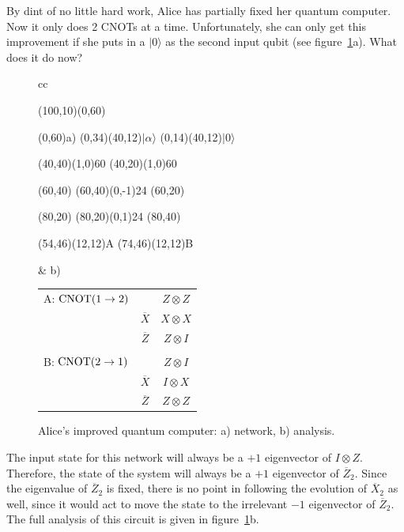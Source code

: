 \begin{example}
By dint of no little hard work, Alice has partially fixed her quantum
computer.  Now it only does 2 CNOTs at a time.  Unfortunately, she
can only get this improvement if she puts in a $|0\rangle$ as the
second input qubit (see figure~\ref{fig:XORswap}a).  What does it do now?
\end{example}
\begin{figure}
\centering
\begin{tabular}{cc}
\begin{picture}(100,10)(0,60)

\put(0,60){a)}
\put(0,34){\makebox(40,12){$|\alpha\rangle$}}
\put(0,14){\makebox(40,12){$|0\rangle$}}

\put(40,40){\line(1,0){60}}
\put(40,20){\line(1,0){60}}

\put(60,40){}
\put(60,40){\line(0,-1){24}}
\put(60,20){}

\put(80,20){}
\put(80,20){\line(0,1){24}}
\put(80,40){}

\put(54,46){\makebox(12,12){A}}
\put(74,46){\makebox(12,12){B}}

\end{picture}
& b)
\begin{tabular}[t]{lcc}
A: ${\rm CNOT}(1 \rightarrow 2)$ & & $Z \otimes Z$ \\
& $\overline{X}$ & $X \otimes X$ \\
& $\overline{Z}$ & $Z \otimes I$ \\
\\
B: ${\rm CNOT}(2 \rightarrow 1)$ & & $Z \otimes I$ \\
& $\overline{X}$ & $I \otimes X$ \\
& $\overline{Z}$ & $Z \otimes Z$
\end{tabular}
\end{tabular}
\caption{Alice's improved quantum computer: a) network, b) analysis.}
\label{fig:XORswap}
\end{figure}

The input state for this network will always be a $+1$ eigenvector of
$I \otimes Z$.  Therefore, the state of the system will always be a
$+1$ eigenvector of $\overline{Z}_2$.  Since the eigenvalue of
$\overline{Z}_2$ is fixed, there is no point in following the
evolution of $\overline{X}_2$ as well, since it would act to move the
state to the irrelevant $-1$ eigenvector of $\overline{Z}_2$.  The
full analysis of this circuit is given in figure~\ref{fig:XORswap}b.

